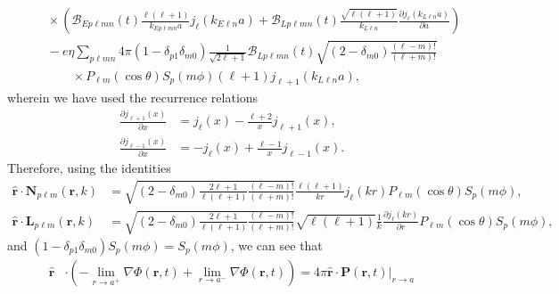 \documentclass{article}
\begin{document}
\begin{equation}
\begin{split}
&\qquad\times\left(\mathcal{B}_{Ep\ell mn}(t)\frac{\ell(\ell + 1)}{k_{Ep\ell mn}a}j_\ell(k_{E\ell n}a) + \mathcal{B}_{Lp\ell mn}(t)\frac{\sqrt{\ell(\ell + 1)}}{k_{L\ell n}}\frac{\partial j_{\ell}(k_{L\ell n}a)}{\partial a}\right)\\
&\qquad - e\eta\sum_{p\ell mn}4\pi(1 - \delta_{p1}\delta_{m0})\frac{1}{\sqrt{2\ell + 1}}\mathcal{B}_{Lp\ell mn}(t)\sqrt{(2 - \delta_{m0})\frac{(\ell - m)!}{(\ell + m)!}}\\
&\qquad\qquad\times P_{\ell m}(\cos\theta)S_p(m\phi)(\ell + 1)j_{\ell + 1}(k_{L\ell n}a),
\end{split}
\end{equation}
wherein we have used the recurrence relations
\begin{equation}
\begin{split}
\frac{\partial j_{\ell + 1}(x)}{\partial x} &= j_\ell(x) - \frac{\ell + 2}{x}j_{\ell + 1}(x),\\
\frac{\partial j_{\ell - 1}(x)}{\partial x} &= -j_\ell(x) + \frac{\ell - 1}{x}j_{\ell - 1}(x).
\end{split}
\end{equation}
Therefore, using the identities
\begin{equation}
\begin{split}
\hat{\mathbf{r}}\cdot\mathbf{N}_{p\ell m}(\mathbf{r},k) &= \sqrt{(2 - \delta_{m0})\frac{2\ell + 1}{\ell(\ell + 1)}\frac{(\ell - m)!}{(\ell + m)!}}\frac{\ell(\ell + 1)}{kr}j_{\ell}(kr)P_{\ell m}(\cos\theta)S_p(m\phi),\\
\hat{\mathbf{r}}\cdot\mathbf{L}_{p\ell m}(\mathbf{r},k) &= \sqrt{(2 - \delta_{m0})\frac{2\ell + 1}{\ell(\ell + 1)}\frac{(\ell - m)!}{(\ell + m)!}}\sqrt{\ell(\ell + 1)}\frac{1}{k}\frac{\partial j_{\ell}(kr)}{\partial r}P_{\ell m}(\cos\theta)S_p(m\phi),
\end{split}
\end{equation}
and $(1 - \delta_{p1}\delta_{m0})S_p(m\phi) = S_p(m\phi)$, we can see that
\begin{equation}
\begin{split}
\hat{\mathbf{r}}&\cdot\left(-\lim_{r\to a^+}\nabla\Phi(\mathbf{r},t) + \lim_{r\to a^-}\nabla\Phi(\mathbf{r},t)\right)
= 4\pi\hat{\mathbf{r}}\cdot\left.\mathbf{P}(\mathbf{r},t)\right|_{r\to a}\\
\end{split}
\end{equation}
\end{document}
